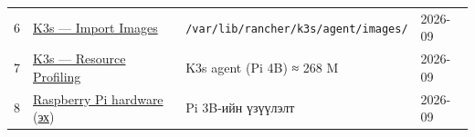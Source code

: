\begin{longtable}[]{@{}llll@{}}
\begin{minipage}[t]{0.22\columnwidth}
6\strut
\end{minipage} & \begin{minipage}[t]{0.22\columnwidth}\raggedright
\href{https://docs.k3s.io/add-ons/import-images}{K3s --- Import Images}\strut
\end{minipage} & \begin{minipage}[t]{0.22\columnwidth}\raggedright
\texttt{/\allowbreak{}var/\allowbreak{}lib/\allowbreak{}rancher/\allowbreak{}k3s/\allowbreak{}agent/\allowbreak{}images/\allowbreak{}}\strut
\end{minipage} & \begin{minipage}[t]{0.22\columnwidth}\raggedright
2026-09\strut
\end{minipage}\tabularnewline
\begin{minipage}[t]{0.22\columnwidth}\raggedright
7\strut
\end{minipage} & \begin{minipage}[t]{0.22\columnwidth}\raggedright
\href{https://docs.k3s.io/reference/resource-profiling}{K3s --- Resource Profiling}\strut
\end{minipage} & \begin{minipage}[t]{0.22\columnwidth}\raggedright
K3s agent (Pi 4B) ≈ 268 M\strut
\end{minipage} & \begin{minipage}[t]{0.22\columnwidth}\raggedright
2026-09\strut
\end{minipage}\tabularnewline
\begin{minipage}[t]{0.22\columnwidth}\raggedright
8\strut
\end{minipage} & \begin{minipage}[t]{0.22\columnwidth}\raggedright
\href{https://www.raspberrypi.com/documentation/computers/raspberry-pi.html}{Raspberry Pi hardware} (\href{https://github.com/raspberrypi/documentation/blob/develop/documentation/asciidoc/computers/raspberry-pi/introduction.adoc}{эх})\strut
\end{minipage} & \begin{minipage}[t]{0.22\columnwidth}\raggedright
Pi 3B-ийн үзүүлэлт\strut
\end{minipage} & \begin{minipage}[t]{0.22\columnwidth}\raggedright
2026-09\strut
\end{minipage}\tabularnewline
\bottomrule
\end{longtable}\endgroup
